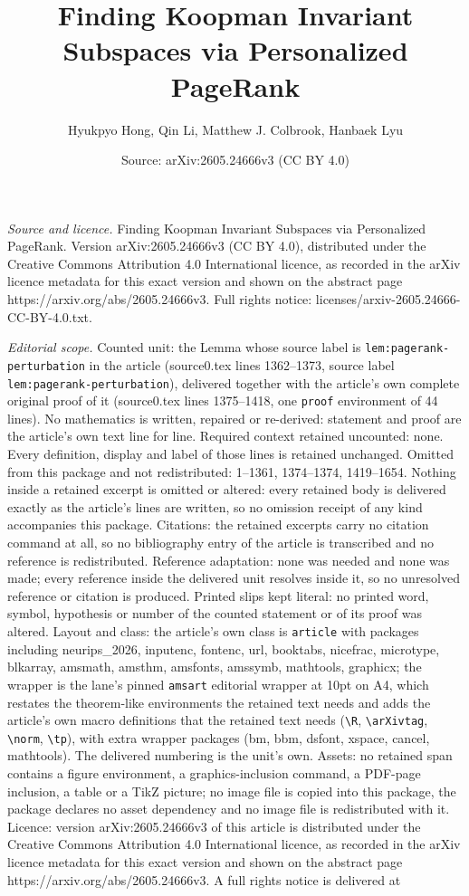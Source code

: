 \documentclass[10pt,a4paper]{amsart}
\title[Finding Koopman Invariant Subspaces via Personalized PageRan]{Finding Koopman Invariant Subspaces via Personalized PageRank}
\author{Hyukpyo Hong, Qin Li, Matthew J. Colbrook, Hanbaek Lyu}
\date{Source: arXiv:2605.24666v3 (CC BY 4.0)}
\begin{document}
\maketitle

\noindent\emph{Source and licence.} Finding Koopman Invariant Subspaces via Personalized PageRank. Version arXiv:2605.24666v3 (CC BY 4.0), distributed under the Creative Commons Attribution 4.0 International licence, as recorded in the arXiv licence metadata for this exact version and shown on the abstract page https://arxiv.org/abs/2605.24666v3. Full rights notice: licenses/arxiv-2605.24666-CC-BY-4.0.txt.\par\smallskip

\noindent\textit{Editorial scope.} Counted unit: the Lemma whose source label is \texttt{lem:pagerank-perturbation} in the article (source0.tex lines 1362--1373, source label \texttt{lem:pagerank-perturbation}), delivered together with the article's own complete original proof of it (source0.tex lines 1375--1418, one \texttt{proof} environment of 44 lines). No mathematics is written, repaired or re-derived: statement and proof are the article's own text line for line. Required context retained uncounted: none. Every definition, display and label of those lines is retained unchanged. Omitted from this package and not redistributed: 1--1361, 1374--1374, 1419--1654. Nothing inside a retained excerpt is omitted or altered: every retained body is delivered exactly as the article's lines are written, so no omission receipt of any kind accompanies this package. Citations: the retained excerpts carry no citation command at all, so no bibliography entry of the article is transcribed and no reference is redistributed. Reference adaptation: none was needed and none was made; every reference inside the delivered unit resolves inside it, so no unresolved reference or citation is produced. Printed slips kept literal: no printed word, symbol, hypothesis or number of the counted statement or of its proof was altered. Layout and class: the article's own class is \texttt{article} with packages including neurips\_2026, inputenc, fontenc, url, booktabs, nicefrac, microtype, blkarray, amsmath, amsthm, amsfonts, amssymb, mathtools, graphicx; the wrapper is the lane's pinned \texttt{amsart} editorial wrapper at 10pt on A4, which restates the theorem-like environments the retained text needs and adds the article's own macro definitions that the retained text needs (\texttt{\textbackslash R}, \texttt{\textbackslash arXivtag}, \texttt{\textbackslash norm}, \texttt{\textbackslash tp}), with extra wrapper packages (bm, bbm, dsfont, xspace, cancel, mathtools). The delivered numbering is the unit's own. Assets: no retained span contains a figure environment, a graphics-inclusion command, a PDF-page inclusion, a table or a TikZ picture; no image file is copied into this package, the package declares no asset dependency and no image file is redistributed with it. Licence: version arXiv:2605.24666v3 of this article is distributed under the Creative Commons Attribution 4.0 International licence, as recorded in the arXiv licence metadata for this exact version and shown on the abstract page https://arxiv.org/abs/2605.24666v3. A full rights notice is delivered at 
\end{document}
